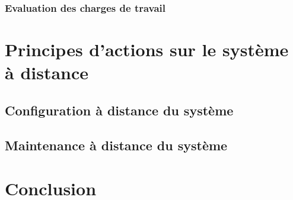 \subsubsection{Evaluation des charges de travail}

\section{Principes d'actions sur le système à distance}
\subsection{Configuration à distance du système}
\subsection{Maintenance à distance du système}
\section{Conclusion}






